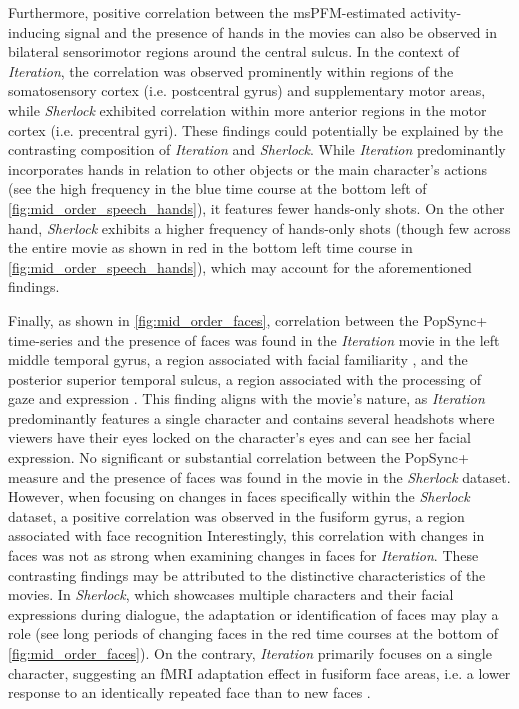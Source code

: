 Furthermore, positive correlation between the msPFM-estimated activity-inducing
signal and the presence of hands in the movies can also be observed in bilateral
sensorimotor regions around the central sulcus. In the context of
\textit{Iteration}, the correlation was observed prominently within regions of
the somatosensory cortex (i.e. postcentral gyrus) and supplementary motor areas,
while \textit{Sherlock} exhibited correlation within more anterior regions in
the motor cortex (i.e. precentral gyri). These findings could potentially be
explained by the contrasting composition of \textit{Iteration} and
\textit{Sherlock}. While \textit{Iteration} predominantly incorporates hands in
relation to other objects or the main character's actions (see the high
frequency in the blue time course at the bottom left of
\cref{fig:mid_order_speech_hands}), it features fewer hands-only shots. On the
other hand, \textit{Sherlock} exhibits a higher frequency of hands-only shots
(though few across the entire movie as shown in red in the bottom left time
course in \cref{fig:mid_order_speech_hands}), which may account for the
aforementioned findings.

Finally, as shown in \cref{fig:mid_order_faces}, correlation between the
PopSync+ time-series and the presence of faces was found in the
\textit{Iteration} movie in the left middle temporal gyrus, a region associated
with facial familiarity \citep{Zhen2013HierarchicalBrainNetwork}, and the
posterior superior temporal sulcus, a region associated with the processing of
gaze and expression \citep{Baseler2012NeuralResponsesExpression}. This finding
aligns with the movie's nature, as \textit{Iteration} predominantly features a
single character and contains several headshots where viewers have their eyes
locked on the character's eyes and can see her facial expression. No significant
or substantial correlation between the PopSync+ measure and the presence of
faces was found in the movie in the \textit{Sherlock} dataset. However, when
focusing on changes in faces specifically within the \textit{Sherlock} dataset,
a positive correlation was observed in the fusiform gyrus, a region associated
with face recognition
\citep{Kanwisher1997FusiformFaceArea,Kanwisher2006fusiformfacearea,Rossion2003functionallydefinedright}
Interestingly, this correlation with changes in faces was not as strong when
examining changes in faces for \textit{Iteration}. These contrasting findings
may be attributed to the distinctive characteristics of the movies. In
\textit{Sherlock}, which showcases multiple characters and their facial
expressions during dialogue, the adaptation or identification of faces may play
a role (see long periods of changing faces in the red time courses at the bottom
of \cref{fig:mid_order_faces}). On the contrary, \textit{Iteration} primarily
focuses on a single character, suggesting an fMRI adaptation effect in fusiform
face areas, i.e. a lower response to an identically repeated face than to new
faces
\citep{Gauthier2001developmentfaceexpertise,Yovel2004FacePerception,Avidan2010Corticalnetworksmediating,Eger2005Familiarityenhancesinvariance,Pourtois2005Twoelectrophysiologicalstages,Rotshtein2004MorphingMarilynMaggie}.

